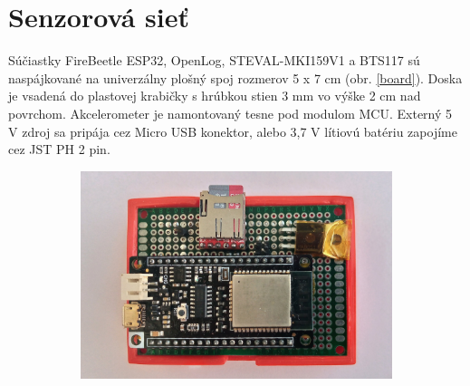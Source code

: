 \section{Senzorová sieť}
Súčiastky FireBeetle ESP32, OpenLog, STEVAL-MKI159V1 a BTS117 sú naspájkované na univerzálny plošný spoj rozmerov 5 x 7 cm
(obr. \ref{board}). Doska je vsadená do plastovej krabičky s hrúbkou stien 3 mm vo výške 2 cm nad povrchom.
Akcelerometer je namontovaný tesne pod modulom MCU. Externý 5 V zdroj sa pripája cez Micro USB konektor, alebo 3,7 V lítiovú batériu 
zapojíme cez JST PH 2 pin.
\begin{figure}[h!]
\centering
\begin{subfigure}{0.6\textwidth}
    \centering
    \includegraphics[width=\textwidth]{figures/design/esp32.jpg}
\end{subfigure}
\begin{subfigure}{0.2\textwidth}
    \centering

\end{subfigure}
\end{figure}
